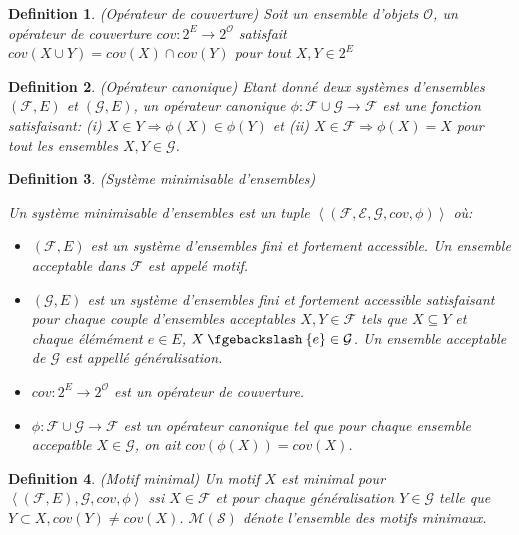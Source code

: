 \documentclass[a4paper,12pt,openany,oneside]{article}
\newcommand{\mysetminus}{\mathbin{\fgebackslash}}
\newtheorem{defn}{Definition} %
\begin{document}
\begin{defn}(Opérateur de couverture)
 Soit un ensemble d'objets $\mathcal{O}$, un opérateur de couverture $cov: 2^E\rightarrow 2^\mathcal{O}$ satisfait $cov(X\cup Y)=cov(X)\cap cov(Y)$ pour tout $X,Y\in 2^E$
\end{defn}

\begin{defn}(Opérateur canonique)
        Etant donné deux systèmes d'ensembles $(\mathcal{F},E)$ et $(\mathcal{G},E)$, un opérateur canonique $\phi: \mathcal{F}\cup \mathcal{G}\rightarrow \mathcal{F}$ est une fonction satisfaisant: (i) $X\in Y\Rightarrow \phi(X)\in \phi(Y)$ et (ii) $X\in \mathcal{F}\Rightarrow\phi(X)=X$ pour tout les ensembles $X,Y\in \mathcal{G}$.
\end{defn}

\begin{defn}(Système minimisable d'ensembles)

Un système minimisable d'ensembles est un tuple $\left< (\mathcal{F},\mathcal{E},\mathcal{G}, cov,\phi)\right>$ où:
\begin{itemize}
        \item $(\mathcal{F},E)$ est un système d'ensembles fini et fortement accessible. Un ensemble acceptable dans $\mathcal{F}$ est appelé motif.
        \item  $(\mathcal{G},E)$ est un système d'ensembles fini et fortement accessible satisfaisant pour chaque couple d'ensembles acceptables $X,Y\in \mathcal{F}$ tels que $X\subseteq Y$ et chaque élémément $e\in E$, $X\mysetminus\{e\}\in \mathcal{G}$. Un ensemble acceptable de $\mathcal{G}$ est appellé \textit{généralisation}.
        \item $cov: 2^E\rightarrow 2^\mathcal{O}$ est un \textit{opérateur de couverture}.
        \item $\phi: \mathcal{F}\cup \mathcal{G}\rightarrow \mathcal{F}$ est un \textit{opérateur canonique} tel que pour chaque ensemble accepatble $X\in \mathcal{G}$, on ait $cov(\phi(X))=cov(X)$.
\end{itemize}

\end{defn}

\begin{defn}(Motif minimal)
Un motif $X$ est \textit{minimal} pour $\left< (\mathcal{F},E),\mathcal{G},cov,\phi \right>$ ssi $X\in \mathcal{F}$ et pour chaque généralisation $Y\in\mathcal{G}$ telle que $Y\subset X, cov(Y)\neq cov(X)$. $\mathcal{M}(\mathcal{S})$
dénote l'ensemble des motifs minimaux.
\end{defn}
\end{document}
